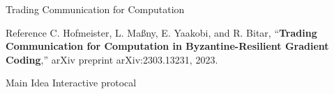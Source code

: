 \documentclass{beamer}
\begin{document}
\begin{frame}{Trading Communication for Computation}
    \begin{block}{Reference}
        C. Hofmeister, L. Maßny, E. Yaakobi, and R. Bitar, “\textbf{Trading Communication for Computation in Byzantine-Resilient Gradient Coding},” arXiv preprint arXiv:2303.13231, 2023.
    \end{block}

    \begin{block}{Main Idea}
        Interactive protocal
    \end{block}
\end{frame}
\end{document}
